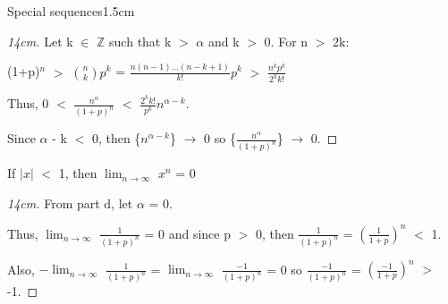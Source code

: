\begin{ltheorem}{Special sequences}{1.5cm}
			\begin{proof}[14cm]
				Let k $\in$ $\mathbb{Z}$ such that k $>$ $\alpha$ and k $>$ 0.
				For n $>$ 2k:

				\hspace{1cm}
				(1+p)$^n$ $>$ $\binom{n}{k} p^k$
				= $\frac{n(n-1)...(n-k+1)}{k!} p^k$
				$>$ $\frac{n^k p^k}{2^k k!}$

				Thus, 0 $<$ $\frac{n^{\alpha}}{(1+p)^n}$
				$<$ $\frac{2^k k!}{p^k} n^{\alpha - k}$.
				
				Since $\alpha$ - k $<$ 0, then \{$n^{\alpha - k}$\} $\rightarrow$ 0
				so \{$\frac{n^{\alpha}}{(1+p)^n}$\} $\rightarrow$ 0.				
			\end{proof}

		\item If $|x|$ $<$ 1, then $\lim_{n \rightarrow \infty}$ $x^n$ = 0

			\begin{proof}[14cm]
				From part d, let $\alpha$ = 0.

				Thus, $\lim_{n \rightarrow \infty}$ $\frac{1}{(1+p)^n}$ = 0
				and since p $>$ 0, then $\frac{1}{(1+p)^n}$ = $(\frac{1}{1+p})^n$ $<$ 1.

				Also, $-\lim_{n \rightarrow \infty}$ $\frac{1}{(1+p)^n}$
				= $\lim_{n \rightarrow \infty}$ $\frac{-1}{(1+p)^n}$ = 0
				so $\frac{-1}{(1+p)^n}$ = $(\frac{-1}{1+p})^n$ $>$ -1.				
			\end{proof}
	\end{ltheorem}



